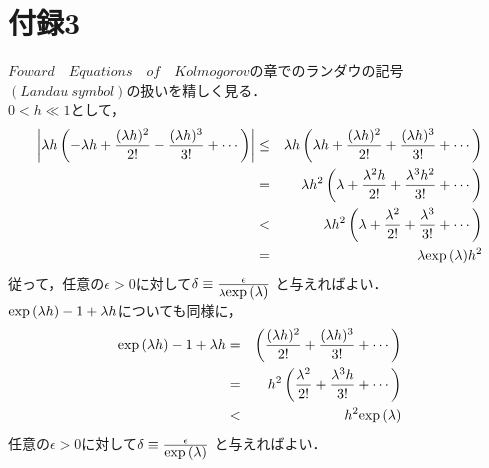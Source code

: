 \documentclass[a4j,papersize,disablejfam,slide,14pt]{jsarticle}
\def\exp#1{\mbox{${\rm exp} \left( #1 \right)$}} %
\begin{document}
\section{付録3}
	$Foward\quad Equations\quad of\quad Kolmogorov$の章でのランダウの記号$(Landau\ symbol)$の扱いを精しく見る．\\
	$0 < h \ll 1$として，
    \begin{eqnarray}
    	\left| \lambda h \left(- \lambda h + \frac{(\lambda h)^2}{2!} - \frac{(\lambda h)^3}{3!} + \cdots \right) \right|
        &\leq& \lambda h \left(\lambda h + \frac{(\lambda h)^2}{2!} + \frac{(\lambda h)^3}{3!} + \cdots \right) \\
        &=& \lambda h^2 \left(\lambda + \frac{\lambda^2 h}{2!} + \frac{\lambda^3 h^2}{3!} + \cdots \right) \\
        &<& \lambda h^2 \left(\lambda + \frac{\lambda^2}{2!} + \frac{\lambda^3}{3!} + \cdots \right) \\
        &=& \lambda \exp{\lambda} h^2
    \end{eqnarray}
    従って，任意の$\epsilon > 0$に対して$\delta \equiv \frac{\epsilon}{\lambda \exp{\lambda}}$ と与えればよい．\\
    $\exp{\lambda h} - 1 + \lambda h$についても同様に，
    \begin{eqnarray}
    	\exp{\lambda h} - 1 + \lambda h &=& \left(\frac{(\lambda h)^2}{2!} + \frac{(\lambda h)^3}{3!} + \cdots \right) \\
        &=& h^2 \left(\frac{\lambda^2}{2!} + \frac{\lambda^3 h}{3!} + \cdots \right) \\
        &<& h^2 \exp{\lambda}
    \end{eqnarray}
    任意の$\epsilon > 0$に対して$\delta \equiv \frac{\epsilon}{\exp{\lambda}}$ と与えればよい．
\end{document}
